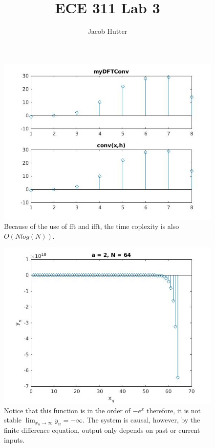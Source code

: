 \documentclass{article}
\author{Jacob Hutter}
\title{ECE 311 Lab 3}
\begin{document}
\maketitle

\begin{figure}[H]

\includegraphics[scale = .5]{report1}
\\ Because of the use of fft and ifft, the time coplexity is also $O(Nlog(N))$.
\end{figure}



\begin{figure}[H]

\includegraphics[scale = .5]{report2}
\\ Notice that this function is in the order of $-e^x$ 
therefore, it is not stable $\lim_{x_n\to\infty} y_n = -\infty$.
The system is causal, however, by the finite difference equation, output only 
depends on past or current inputs.
\end{figure}
\end{document}
